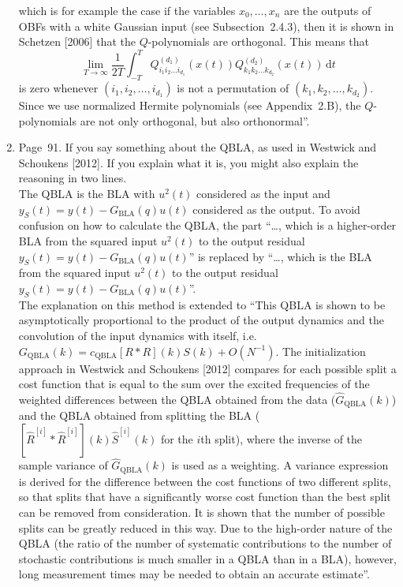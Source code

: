 \documentclass{article}
\newenvironment{answer}{\noindent\ignorespaces\color{blue}}{\noindent\ignorespacesafterend}
\newcommand{\ans}[1]{\begin{answer}#1\end{answer}}
\newcommand{\oldnewpage}[2]{\marginpar{{\color{black}#1} / {\color{red}#2}}}
\begin{document}
\begin{enumerate}
{which is for example the case if the variables \mbox{$x_0, \ldots, x_n$} are the outputs of OBFs with a white Gaussian input (see Subsection~2.4.3),
then it is shown in Schetzen [2006] that the $Q$-polynomials are orthogonal.
This means that
\begin{equation*}
	\lim_{T \rightarrow \infty} \frac{1}{2 T} \int_{-T}^{T} Q_{i_1 i_2 \ldots i_{d_1}}^{(d_1)}(x(t)) Q_{k_1 k_2 \ldots k_{d_2}}^{(d_2)}(x(t)) \, \mathrm{d}t
\end{equation*}
is zero whenever \mbox{$(i_1, i_2, \ldots, i_{d_1})$} is not a permutation of \mbox{$(k_1, k_2, \ldots, k_{d_2})$}.
Since we use normalized Hermite polynomials (see Appendix~2.B), the $Q$-polynomials are not only orthogonal, but also orthonormal''.}
	\item Page~91. If you say something about the QBLA, as used in Westwick and Schoukens [2012]. If you explain what it is, you might also explain the reasoning in two lines.\\
		\ans{\oldnewpage{91}{95}The QBLA is the BLA with $u^2(t)$ considered as the input and \mbox{$y_S(t) = y(t) - G_\mathrm{BLA}(q) u(t)$} considered as the output. To avoid confusion on how to calculate the QBLA, the part ``\ldots, which is a higher-order BLA from the squared input $u^2(t)$ to the output residual \mbox{$y_S(t) = y(t) - G_\mathrm{BLA}(q) u(t)$}'' is replaced by ``\ldots, which is the BLA from the squared input $u^2(t)$ to the output residual \mbox{$y_S(t) = y(t) - G_\mathrm{BLA}(q) u(t)$}''.\\
			The explanation on this method is extended to ``This QBLA is shown to be asymptotically proportional to the product of the output dynamics and the convolution of the input dynamics with itself, i.e. \mbox{$G_\mathrm{QBLA}(k) = c_\mathrm{QBLA} [R * R](k) S(k) + O(N^{-1})$}. The initialization approach in Westwick and Schoukens [2012] compares for each possible split a cost function that is equal to the sum over the excited frequencies of the weighted differences between the QBLA obtained from the data ($\hat{G}_\mathrm{QBLA}(k)$) and the QBLA obtained from splitting the BLA (\mbox{$\left[\hat{R}^{[i]} * \hat{R}^{[i]}\right](k) \hat{S}^{[i]}(k)$} for the $i$th split), where the inverse of the sample variance of $\hat{G}_\mathrm{QBLA}(k)$ is used as a weighting. A variance expression is derived for the difference between the cost functions of two different splits, so that splits that have a significantly worse cost function than the best split can be removed from consideration. It is shown that the number of possible splits can be greatly reduced in this way. Due to the high-order nature of the QBLA (the ratio of the number of systematic contributions to the number of stochastic contributions is much smaller in a QBLA than in a BLA), however, long measurement times may be needed to obtain an accurate estimate''.}

\end{enumerate}
\end{document}
